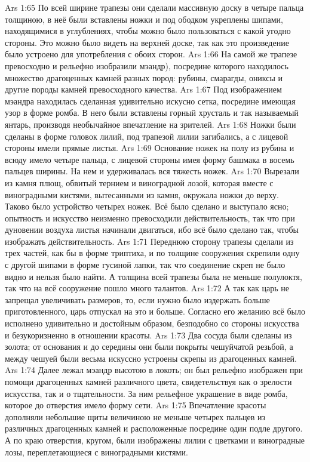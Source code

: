 \vs Ars 1:65
По всей ширине трапезы они сделали массивную доску в четыре пальца толщиною, в неё были вставлены ножки и под ободком укреплены шипами, находящимися в углублениях, чтобы можно было пользоваться с какой угодно стороны. Это можно было видеть на верхней доске, так как это произведение было устроено для употребления с обоих сторон.
\vs Ars 1:66
На самой же трапезе превосходно и рельефно изобразили мэандр), посредине которого находилось множество драгоценных камней разных пород: рубины, смарагды, ониксы и другие породы камней превосходного качества.
\vs Ars 1:67
Под изображением мэандра находилась сделанная удивительно искусно сетка, посредине имеющая узор в форме ромба. В него были вставлены горный хрусталь и так называемый янтарь, производя необычайное впечатление на зрителей.
\vs Ars 1:68
Ножки были сделаны в форме головок лилий, под трапезой лилии загибались, а с лицевой стороны имели прямые листья.
\vs Ars 1:69
Основание ножек на полу из рубина и всюду имело четыре пальца, с лицевой стороны имея форму башмака в восемь пальцев ширины. На нем и удерживалась вся тяжесть ножек.
\vs Ars 1:70
Вырезали из камня плющ, обвитый тернием и виноградной лозой, которая вместе с виноградными кистями, вытесанными из камня, окружала ножки до верху. Таково было устройство четырех ножек. Всё было сделано и выступало ясно; опытность и искусство неизменно превосходили действительность, так что при дуновении воздуха листья начинали двигаться, ибо всё было сделано так, чтобы изображать действительность.
\vs Ars 1:71
Переднюю сторону трапезы сделали из трех частей, как бы в форме триптиха, и по толщине сооружения скрепили одну с другой шипами в форме гусиной лапки, так что соединение скреп не было видно и нельзя было найти. А толщина всей трапезы была не меньше полулоктя, так что на всё сооружение пошло много талантов.
\vs Ars 1:72
А так как царь не запрещал увеличивать размеров, то, если нужно было издержать больше приготовленного, царь отпускал на это и больше. Согласно его желанию всё было исполнено удивительно и достойным образом, безподобно со стороны искусства и безукоризненно в отношении красоты.
\vs Ars 1:73
Два сосуда были сделаны из золота; от основания и до середины они были покрыты чешуйчатой резьбой, а между чешуей были весьма искуссно устроены скрепы из драгоценных камней.
\vs Ars 1:74
Далее лежал мэандр высотою в локоть; он был рельефно изображен при помощи драгоценных камней различного цвета, свидетельствуя как о зрелости искусства, так и о тщательности. За ним рельефное украшение в виде ромба, которое до отверстия имело форму сети.
\vs Ars 1:75
Впечатление красоты дополняли небольшие щиты величиною не меньше четырех пальцев из различных драгоценных камней и расположенные посредине один подле другого. А по краю отверстия, кругом, были изображены лилии с цветками и виноградные лозы, переплетающиеся с виноградными кистями.
